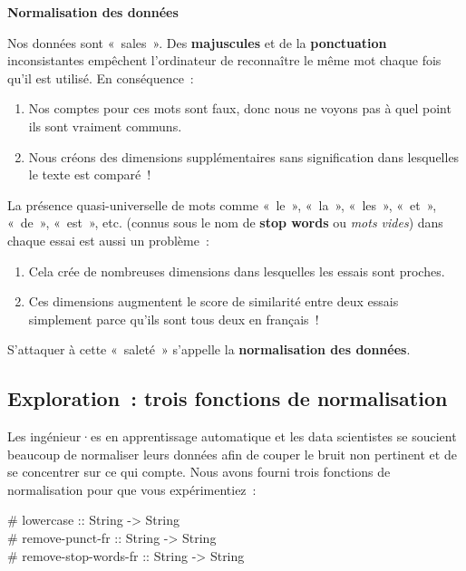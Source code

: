 \documentclass[12pt,a4paper]{article}
\newcommand{\contrat}[1]{%
  \begin{contractbox}
    \ttfamily #1
  \end{contractbox}
}
\begin{document}
\begin{keypointbox}
  \textbf{Normalisation des données}

  Nos données sont «~sales~». Des \textbf{majuscules} et de la \textbf{ponctuation} inconsistantes empêchent l'ordinateur de reconnaître le même mot chaque fois qu'il est utilisé. En conséquence~:
  \begin{enumerate}
    \item Nos comptes pour ces mots sont faux, donc nous ne voyons pas à quel point ils sont vraiment communs.
    \item Nous créons des dimensions supplémentaires sans signification dans lesquelles le texte est comparé~!
  \end{enumerate}

  La présence quasi-universelle de mots comme «~le~», «~la~», «~les~», «~et~», «~de~», «~est~», etc. (connus sous le nom de \textbf{stop words} ou \emph{mots vides}) dans chaque essai est aussi un problème~:
  \begin{enumerate}
    \item Cela crée de nombreuses dimensions dans lesquelles les essais sont proches.
    \item Ces dimensions augmentent le score de similarité entre deux essais simplement parce qu'ils sont tous deux en français~!
  \end{enumerate}

  S'attaquer à cette «~saleté~» s'appelle la \textbf{normalisation des données}.
\end{keypointbox}

\subsection{Exploration~: trois fonctions de normalisation}

\begin{keypointbox}
  Les ingénieur·es en apprentissage automatique et les data scientistes se soucient beaucoup de normaliser leurs données afin de couper le bruit non pertinent et de se concentrer sur ce qui compte. Nous avons fourni trois fonctions de normalisation pour que vous expérimentiez~:

  \contrat{\# lowercase :: String -> String\\
\# remove-punct-fr :: String -> String\\
\# remove-stop-words-fr :: String -> String}
\end{keypointbox}
\end{document}
